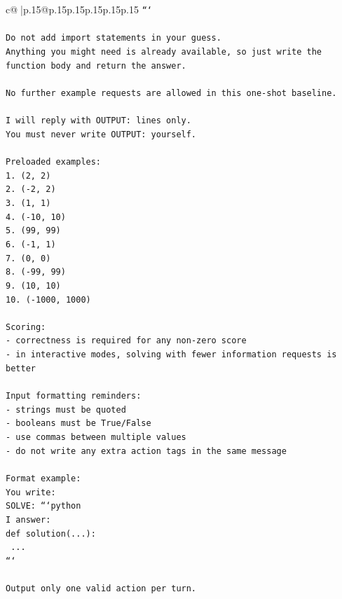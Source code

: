 \documentclass{article}
\begin{document}
{\begin{supertabular}{c@{$\;$}|p{.15\linewidth}@{}p{.15\linewidth}p{.15\linewidth}p{.15\linewidth}p{.15\linewidth}p{.15\linewidth}}
{{{\texttt{```} \\
\\ 
\texttt{Do not add import statements in your guess.} \\
\texttt{Anything you might need is already available, so just write the function body and return the answer.} \\
\\ 
\texttt{No further example requests are allowed in this one{-}shot baseline.} \\
\\ 
\texttt{I will reply with OUTPUT: lines only.} \\
\texttt{You must never write OUTPUT: yourself.} \\
\\ 
\texttt{Preloaded examples:} \\
\texttt{1. (2, 2)} \\
\texttt{2. ({-}2, 2)} \\
\texttt{3. (1, 1)} \\
\texttt{4. ({-}10, 10)} \\
\texttt{5. (99, 99)} \\
\texttt{6. ({-}1, 1)} \\
\texttt{7. (0, 0)} \\
\texttt{8. ({-}99, 99)} \\
\texttt{9. (10, 10)} \\
\texttt{10. ({-}1000, 1000)} \\
\\ 
\texttt{Scoring:} \\
\texttt{{-} correctness is required for any non{-}zero score} \\
\texttt{{-} in interactive modes, solving with fewer information requests is better} \\
\\ 
\texttt{Input formatting reminders:} \\
\texttt{{-} strings must be quoted} \\
\texttt{{-} booleans must be True/False} \\
\texttt{{-} use commas between multiple values} \\
\texttt{{-} do not write any extra action tags in the same message} \\
\\ 
\texttt{Format example:} \\
\texttt{You write:} \\
\texttt{SOLVE: ```python} \\
\texttt{I answer:} \\
\texttt{def solution(...):} \\
\texttt{    ...} \\
\texttt{```} \\
\\ 
\texttt{Output only one valid action per turn.} \\
            }
        }
    }
     \\ \\


\end{supertabular}}
\end{document}
